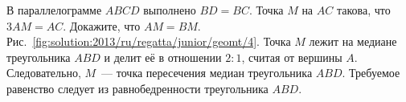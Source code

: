 \problem
В параллелограмме $ABCD$ выполнено $BD = BC$.
Точка $M$ на $AC$ такова, что $3 AM = AC$.
Докажите, что $AM = BM$.
%
\label{solution:2013/ru/regatta/junior/geomt/4}%
Рис.~\ref{fig:solution:2013/ru/regatta/junior/geomt/4}.
Точка $M$ лежит на медиане треугольника $ABD$ и делит её в отношении $2 : 1$,
считая от вершины $A$.
Следовательно, $M$~--- точка пересечения медиан треугольника $ABD$.
Требуемое равенство следует из равнобедренности треугольника $ABD$.
\endproblem
